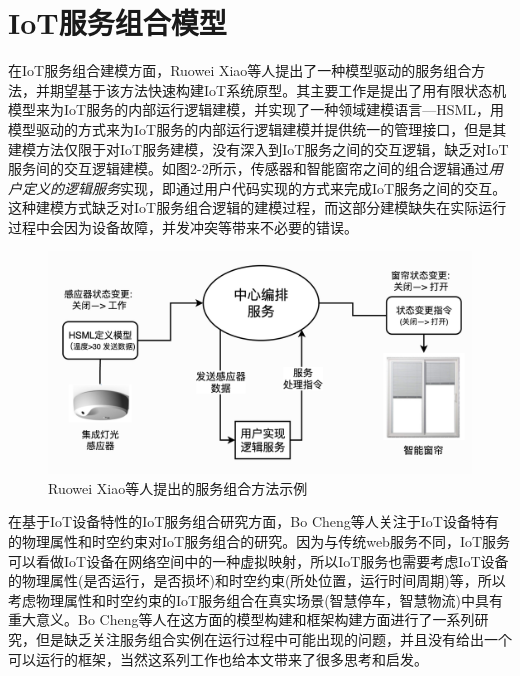 \documentclass[winfonts,master,twoside]{njuthesis}
\begin{document}
\section{IoT服务组合模型}
在IoT服务组合建模方面，Ruowei Xiao等人\cite{xiao2019finite}\cite{tao2018multi}提出了一种模型驱动的服务组合方法，并期望基于该方法快速构建IoT系统原型。其主要工作是提出了用有限状态机模型来为IoT服务的内部运行逻辑建模，并实现了一种领域建模语言—HSML，用模型驱动的方式来为IoT服务的内部运行逻辑建模并提供统一的管理接口，但是其建模方法仅限于对IoT服务建模，没有深入到IoT服务之间的交互逻辑，缺乏对IoT服务间的交互逻辑建模。如图2-2所示，传感器和智能窗帘之间的组合逻辑通过\textit{用户定义的逻辑服务}实现，即通过用户代码实现的方式来完成IoT服务之间的交互。这种建模方式缺乏对IoT服务组合逻辑的建模过程，而这部分建模缺失在实际运行过程中会因为设备故障，并发冲突等带来不必要的错误。
\begin{figure}
	\centering
	\includegraphics[width=1.0\textwidth]{figure/2-relatework/hsml.png}
	\caption{Ruowei Xiao等人提出的服务组合方法示例}
	\label{ontransact-impl}
\end{figure}

在基于IoT设备特性的IoT服务组合研究方面，Bo Cheng等人\cite{cheng2016situation}\cite{cheng2017situation}\cite{cheng2018lightweight}关注于IoT设备特有的物理属性和时空约束对IoT服务组合的研究。因为与传统web服务不同，IoT服务可以看做IoT设备在网络空间中的一种虚拟映射，所以IoT服务也需要考虑IoT设备的物理属性(是否运行，是否损坏)和时空约束(所处位置，运行时间周期)等，所以考虑物理属性和时空约束的IoT服务组合在真实场景(智慧停车，智慧物流)中具有重大意义。Bo Cheng等人在这方面的模型构建和框架构建方面进行了一系列研究，但是缺乏关注服务组合实例在运行过程中可能出现的问题，并且没有给出一个可以运行的框架，当然这系列工作也给本文带来了很多思考和启发。
\end{document}
